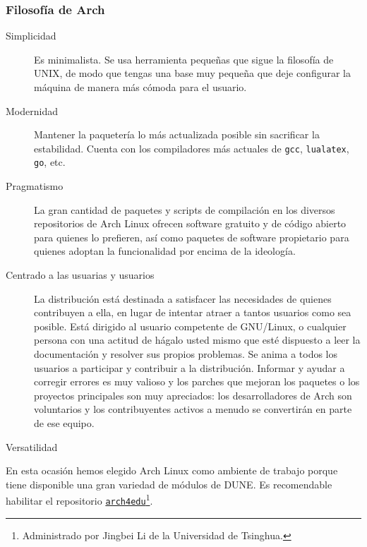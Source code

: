 \documentclass[
	spanish,
	9pt,
	xcolor=table,
	handout,
	aspectratio=1610,
  ignorenonframetext
]{beamer}
\begin{document}
\begin{frame}
  \frametitle{Filosofía de Arch}

  \begin{description}
    \item[Simplicidad]
          Es minimalista.
          Se usa herramienta pequeñas que sigue la filosofía de UNIX, de modo que tengas una base muy pequeña que deje configurar la máquina de manera más cómoda para el usuario.
    \item[Modernidad]
          Mantener la paquetería lo más actualizada posible sin sacrificar la estabilidad. Cuenta con los compiladores más actuales de \lstinline{gcc}, \lstinline{lualatex}, \lstinline{go}, etc.
    \item[Pragmatismo]
          La gran cantidad de paquetes y scripts de compilación en los diversos repositorios de Arch Linux ofrecen software gratuito y de código abierto para quienes lo prefieren, así como paquetes de software propietario para quienes adoptan la funcionalidad por encima de la ideología.
    \item[Centrado a las usuarias y usuarios]
          La distribución está destinada a satisfacer las necesidades de quienes contribuyen a ella, en lugar de intentar atraer a tantos usuarios como sea posible.
          Está dirigido al usuario competente de GNU/Linux, o cualquier persona con una actitud de hágalo usted mismo que esté dispuesto a leer la documentación y resolver sus propios problemas.
          Se anima a todos los usuarios a participar y contribuir a la distribución.
          Informar y ayudar a corregir errores es muy valioso y los parches que mejoran los paquetes o los proyectos principales son muy apreciados: los desarrolladores de Arch son voluntarios y los contribuyentes activos a menudo se convertirán en parte de ese equipo.
    \item[Versatilidad]
  \end{description}

\end{frame}

\begin{frame}

  En esta ocasión hemos elegido Arch Linux como ambiente de trabajo porque tiene disponible una gran variedad de módulos de DUNE.
  Es recomendable habilitar el repositorio \href{https://wiki.archlinux.org/title/Unofficial\_user\_repositories\#arch4edu}{\texttt{arch4edu}}\footnote{Administrado por Jingbei Li de la Universidad de Tsinghua.}.
\end{frame}
\end{document}
